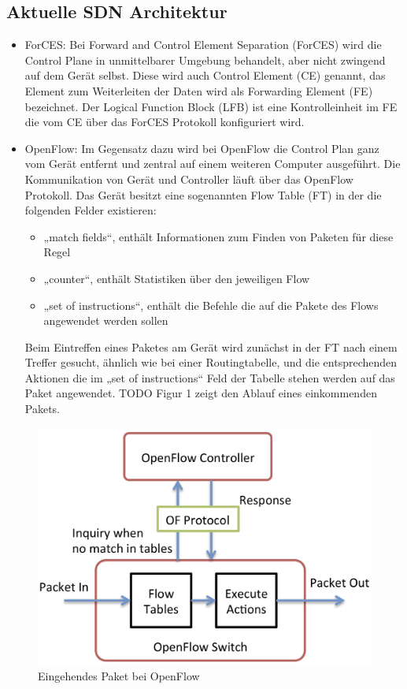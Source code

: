\documentclass[twoside,12pt]{scrartcl}
\begin{document}
	\subsection{Aktuelle SDN Architektur}
		\begin{itemize}
			\item ForCES: Bei Forward and Control Element Separation (ForCES) wird die Control Plane in unmittelbarer Umgebung behandelt, aber nicht zwingend auf dem Gerät selbst. Diese wird auch Control Element (CE) genannt, das Element zum Weiterleiten der Daten wird als Forwarding Element (FE) bezeichnet. Der Logical Function Block (LFB) ist eine Kontrolleinheit im FE die vom CE über das ForCES Protokoll konfiguriert wird.
			\item OpenFlow: Im Gegensatz dazu wird bei OpenFlow die Control Plan ganz vom Gerät entfernt und zentral auf einem weiteren Computer ausgeführt. Die Kommunikation von Gerät und Controller läuft über das OpenFlow Protokoll. Das Gerät besitzt eine sogenannten Flow Table (FT) in der die folgenden Felder existieren: 
			\begin{itemize}
				\item „match fields“, enthält Informationen zum Finden von Paketen für diese Regel
				\item „counter“, enthält Statistiken über den jeweiligen Flow
				\item „set of instructions“, enthält die Befehle die auf die Pakete des Flows angewendet werden sollen
				\end{itemize}
Beim Eintreffen eines Paketes am Gerät wird zunächst in der FT nach einem Treffer gesucht, ähnlich wie bei einer Routingtabelle, und die entsprechenden Aktionen die im „set of instructions“ Feld der Tabelle stehen werden auf das Paket angewendet.
TODO Figur 1 zeigt den Ablauf eines einkommenden Pakets.
		\end{itemize}
		\begin{figure}
	\centering
	\includegraphics[width=0.95\linewidth]{openflow-paket-incoming}
	\caption{Eingehendes Paket bei OpenFlow}
	\label{fig:openflow-paket-incoming}
\end{figure}
\end{document}
